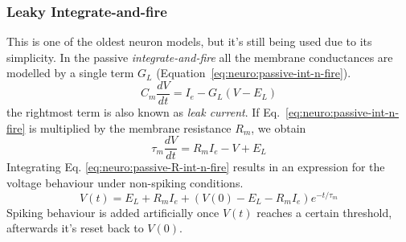 \subsubsection{Leaky Integrate-and-fire}
This is one of the oldest neuron models, but it's still being used due to its simplicity. In the passive \emph{integrate-and-fire} all the membrane conductances are modelled by a single term $G_{L}$ (Equation~\ref{eq:neuro:passive-int-n-fire}).
\begin{equation}
C_{m}\frac{dV}{dt} = I_{e} - G_{L}\left( V - E_{L} \right) 
\label{eq:neuro:passive-int-n-fire}
\end{equation}
the rightmost term is also known as \emph{leak current}. If Eq.~\ref{eq:neuro:passive-int-n-fire} is multiplied by the membrane resistance $R_{m}$, we obtain
\begin{equation}
\tau_{m}\frac{dV}{dt} = R_{m}I_{e} - V + E_{L}  
\label{eq:neuro:passive-R-int-n-fire}
\end{equation}
Integrating Eq. \ref{eq:neuro:passive-R-int-n-fire} results in an expression for the voltage behaviour under non-spiking conditions.
\begin{equation}
V\left( t \right) = E_{L} + R_{m}I_{e} + 
                    \left( V\left( 0 \right) - E_{L} - R_{m}I_{e}\right) e^{ -t/\tau_{m}}
\label{eq:neuro:passive-V-int-n-fire}
\end{equation}
Spiking behaviour is added artificially once $V(t)$ reaches a certain threshold, afterwards it's reset back to $V(0)$.


